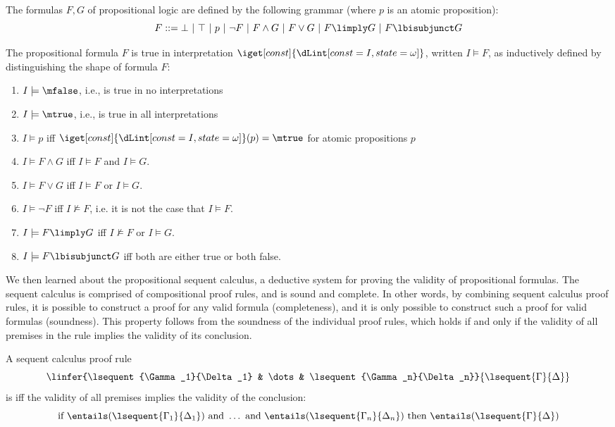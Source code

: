 \documentclass[11pt,twoside]{scrartcl}
\begin{document}
\begin{definition}
\label{def:proplog-grammer}
  The formulas $F,G$ of propositional logic are defined by the following grammar (where $p$ is an atomic proposition):
  \[
  F \bebecomes \bot \alternative \top \alternative p \alternative \lnot F \alternative F\land G \alternative F\lor G \alternative F\limply G \alternative F \lbisubjunct G
  \]
\end{definition}

\begin{definition} \label{def:propositional-semantics}
The propositional formula $F$ is true in interpretation $\iget[const]{\I}$, written \(I \models F\), as inductively defined by distinguishing the shape of formula $F$:
\begin{enumerate}
\item \(I \models \mfalse\), i.e., \mfalse is true in no interpretations
\item \(I \models \mtrue\), i.e., \mtrue is true in all interpretations
\item \(I \models p\) iff \(\iget[const]{\I}(p)=\mtrue\) for atomic propositions $p$
\item \(I \models F\land G\) iff \(I \models F\) and \(I \models G\).
\item \(I \models F\lor G\) iff \(I \models F\) or \(I \models G\).
\item \(I \models \lnot F\) iff \(I \not\models F\), i.e. it is not the case that \(I \models F\).
\item \(I \models F\limply G\) iff \(I \not\models F\) or \(I \models G\).
\item \(I \models F\lbisubjunct G\) iff both are either true or both false.
\end{enumerate}
\end{definition}
We then learned about the propositional sequent calculus, a deductive system for proving the validity of propositional formulas. The sequent calculus is comprised of compositional proof rules, and is sound and complete. In other words, by combining sequent calculus proof rules, it is possible to construct a proof for any valid formula (completeness), and it is only possible to construct such a proof for valid formulas (soundness). This property follows from the soundness of the individual proof rules, which holds if and only if the validity of all premises in the rule implies the validity of its conclusion.

\begin{definition}
  A sequent calculus proof rule
  \[
  \linfer
  {\lsequent{\Gamma_1}{\Delta_1} & \dots & \lsequent{\Gamma_n}{\Delta_n}}
  {\lsequent{\Gamma}{\Delta}}
  \]
  is  iff the validity of all premises implies the validity of the conclusion:
  \[
  \text{if}~
  \entails (\lsequent{\Gamma_1}{\Delta_1}) ~\text{and}~ 
  \dots
  ~\text{and}~
  \entails (\lsequent{\Gamma_n}{\Delta_n})
  ~\text{then}~
  \entails (\lsequent{\Gamma}{\Delta})
  \]
\end{definition}
\end{document}
